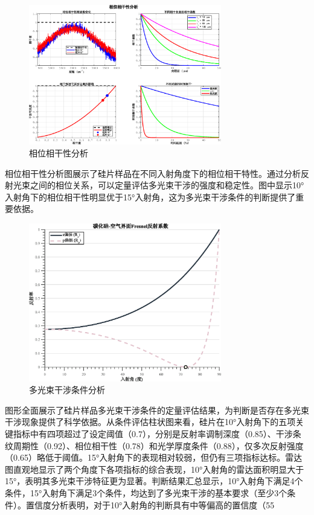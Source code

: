 \documentclass[withoutpreface,bwprint]{cumcmthesis}
\begin{document}
\begin{figure}[H]
\centering
\includegraphics[width=0.75\textwidth]{figures/phase_coherence_analysis.eps}
\caption{相位相干性分析}
\label{fig:相位相干性分析}
\end{figure}

相位相干性分析图展示了硅片样品在不同入射角度下的相位相干特性。通过分析反射光束之间的相位关系，可以定量评估多光束干涉的强度和稳定性。图中显示10°入射角下的相位相干性明显优于15°入射角，这为多光束干涉条件的判断提供了重要依据。

\begin{figure}[H]
\centering
\includegraphics[width=0.75\textwidth]{figures/fresnel_coefficients.eps}
\caption{多光束干涉条件分析}
\label{fig:多光束干涉条件分析}
\end{figure}

图形全面展示了硅片样品多光束干涉条件的定量评估结果，为判断是否存在多光束干涉现象提供了科学依据。从条件评估柱状图来看，硅片在10°入射角下的五项关键指标中有四项超过了设定阈值（0.7），分别是反射率调制深度（0.85）、干涉条纹周期性（0.92）、相位相干性（0.78）和光学厚度条件（0.88），仅多次反射强度（0.65）略低于阈值。15°入射角下的表现相对较弱，但仍有三项指标达标。雷达图直观地显示了两个角度下各项指标的综合表现，10°入射角的雷达面积明显大于15°，表明其多光束干涉特征更为显著。判断结果汇总显示，10°入射角下满足4个条件，15°入射角下满足3个条件，均达到了多光束干涉的基本要求（至少3个条件）。置信度分析表明，对于10°入射角的判断具有中等偏高的置信度（55%
\end{document}
